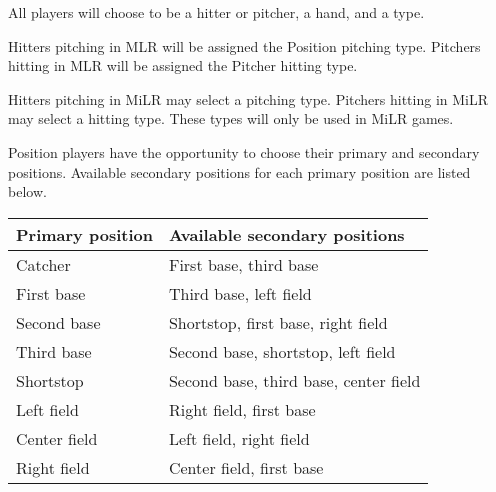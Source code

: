 \begin{deepEnumerate}
	\item All players will choose to be a hitter or pitcher, a hand, and a type.
	\begin{deepEnumerate}
		\item Hitters pitching in MLR will be assigned the Position pitching type. Pitchers hitting in MLR will be assigned the Pitcher hitting type.
		\item Hitters pitching in MiLR may select a pitching type. Pitchers hitting in MiLR may select a hitting type. These types will only be used in MiLR games.
		\item Position players have the opportunity to choose their primary and secondary positions.
		Available secondary positions for each primary position are listed below.
	
		\begin{center}
			\begin{tabular}{|l|l|}
				\hline
				Primary position & Available secondary positions         \\
				\hline
				Catcher          & First base, third base                \\
				\hline
				First base       & Third base, left field                \\
				\hline
				Second base      & Shortstop, first base, right field    \\
				\hline
				Third base       & Second base, shortstop, left field    \\
				\hline
				Shortstop        & Second base, third base, center field \\
				\hline
				Left field       & Right field, first base               \\
				\hline
				Center field     & Left field, right field               \\
				\hline
				Right field      & Center field, first base              \\
				\hline 
			\end{tabular}
		\end{center}
	\end{deepEnumerate}
\end{deepEnumerate}


